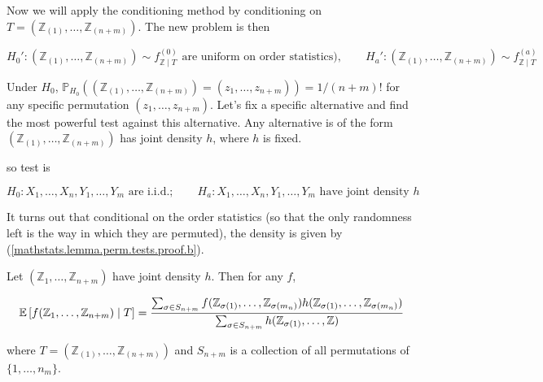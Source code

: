Now we will apply the conditioning method by conditioning on \(T = (\mathbb{Z}_{(1)}, \ldots, \mathbb{Z}_{(n+m)})\). The new problem is then 

\[
H_0': (\mathbb{Z}_{(1)}, \ldots, \mathbb{Z}_{(n+m)}) \sim f_{\mathbb{Z} \mid T}^{(0)} \text{ are uniform on order statistics)}, \qquad H_a': (\mathbb{Z}_{(1)}, \ldots, \mathbb{Z}_{(n+m)}) \sim f_{\mathbb{Z} \mid T}^{(a)}
\]

Under \(H_0\), \(\mathbb{P}_{H_0} \left(  (\mathbb{Z}_{(1)}, \ldots, \mathbb{Z}_{(n+m)}) = (z_1, \ldots, z_{n+m}) \right)  = 1/(n+m)!\) for any specific permutation \( (z_1, \ldots, z_{n+m}) \). Let's fix a specific alternative and find the most powerful test against this alternative. Any alternative is of the form \((\mathbb{Z}_{(1)}, \ldots, \mathbb{Z}_{(n+m)})\) has joint density \(h\), where \(h\) is fixed.

so test is

\[
H_0: X_1, \ldots, X_n, Y_1, \ldots, Y_m \text{ are i.i.d.}; \qquad H_a: X_1, \ldots, X_n, Y_1, \ldots, Y_m \text{ have joint density } h
\]

It turns out that conditional on the order statistics (so that the only randomness left is the way in which they are permuted), the density is given by (\ref{mathstats.lemma.perm.tests.proof.b}).

\begin{theorem}

\end{theorem}

\begin{lemma}

Let \((\mathbb{Z}_{1}, \ldots, \mathbb{Z}_{n+m})\) have joint density \(h\). Then for any \(f\), 

\begin{equation}\label{mathstats.perm.test.lemma.exp.form}
\E\left[ f(\mathbb{Z}_{1}, \ldots, \mathbb{Z}_{n+m}) \mid T \right] = 
\frac{\sum_{\sigma \in S_{n+m}} f( \mathbb{Z}_{\sigma(1)}, \ldots, \mathbb{Z}_{\sigma(m_n)} ) h( \mathbb{Z}_{\sigma(1)}, \ldots, \mathbb{Z}_{\sigma(m_n)} )}
{\sum_{\sigma \in S_{n+m}} h( \mathbb{Z}_{\sigma(1)}, \ldots, \mathbb{Z})}
\end{equation}

where \(T = (\mathbb{Z}_{(1)}, \ldots, \mathbb{Z}_{(n+m)})\) and \(S_{n+m}\) is a collection of all permutations of \(\{1, \ldots, n_m\}\). 

\end{lemma}

